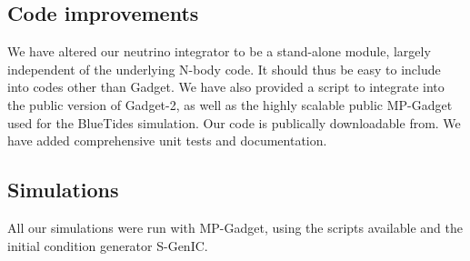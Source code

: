 \documentclass[useAMS, usenatbib]{mnras}
\begin{document}
\subsection{Code improvements}
\label{sec:code}

We have altered our neutrino integrator to be a stand-alone module, largely
independent of the underlying N-body code. It should thus be easy to include
into codes other than Gadget. We have also provided a script to integrate into the
public version of Gadget-2, as well as the highly scalable public MP-Gadget
used for the BlueTides simulation. Our code is publically downloadable from.
We have added comprehensive unit tests and documentation.

\subsection{Simulations}
\label{sec:simulations}

All our simulations were run with MP-Gadget, using the scripts available
and the initial condition generator S-GenIC.
\end{document}
